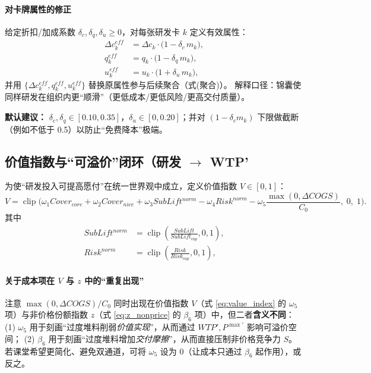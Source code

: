 \documentclass[UTF8,12pt]{ctexart}
\newcommand{\clip}{\operatorname{clip}}
\begin{document}
\paragraph{对卡牌属性的修正}
给定折扣/加成系数 $\delta_c,\delta_q,\delta_u\ge 0$，对每张研发卡 $k$ 定义有效属性：
\begin{align}
\Delta c_k^{eff} &= \Delta c_k\cdot \big(1-\delta_c\, m_k\big),\\
q_k^{eff} &= q_k\cdot \big(1-\delta_q\, m_k\big),\\
u_k^{eff} &= u_k\cdot \big(1+\delta_u\, m_k\big),
\end{align}
并用 $\{\Delta c_k^{eff},q_k^{eff},u_k^{eff}\}$ 替换原属性参与后续聚合（式(聚合)）。
解释口径：锦囊使同样研发在组织内更“顺滑”（更低成本/更低风险/更高交付质量）。

\textbf{默认建议：} $\delta_c,\delta_q\in[0.10,0.35]$，$\delta_u\in[0,0.20]$；并对 $(1-\delta_c m_k)$ 下限做截断（例如不低于 0.5）以防止“免费降本”极端。

\subsection{价值指数与“可溢价”闭环（研发 $\rightarrow$ WTP'}
为使“研发投入可提高愿付”在统一世界观中成立，定义价值指数 $V\in[0,1]$：
\begin{equation}
V = \clip\!\Big(
\omega_1 Cover_{core} + \omega_2 Cover_{nice} + \omega_3 SubLift^{norm}
- \omega_4 Risk^{norm} - \omega_5 \frac{\max(0,\Delta COGS)}{C_0},
\;0,\;1\Big).
\label{eq:value_index}
\end{equation}
其中
\begin{align}
SubLift^{norm} &= \clip\!\left(\frac{SubLift}{SubLift_{cap}},0,1\right),\\
Risk^{norm} &= \clip\!\left(\frac{Risk}{Risk_{cap}},0,1\right),
\end{align}

\paragraph{关于成本项在 $V$ 与 $z$ 中的“重复出现”}
注意 $\max(0,\Delta COGS)/C_0$ 同时出现在价值指数 $V$（式 \eqref{eq:value_index} 的 $\omega_5$ 项）与非价格份额指数 $z$（式 \eqref{eq:z_nonprice} 的 $\beta_6$ 项）中，但二者\textbf{含义不同}：
(1) $\omega_5$ 用于刻画“过度堆料削弱\emph{价值实现}”，从而通过 $WTP',P^{\max\prime}$ 影响可溢价空间；
(2) $\beta_6$ 用于刻画“过度堆料增加\emph{交付摩擦}”，从而直接压制非价格竞争力 $S$。
若课堂希望更简化、避免双通道，可将 $\omega_5$ 设为 0（让成本只通过 $\beta_6$ 起作用），或反之。
\end{document}
